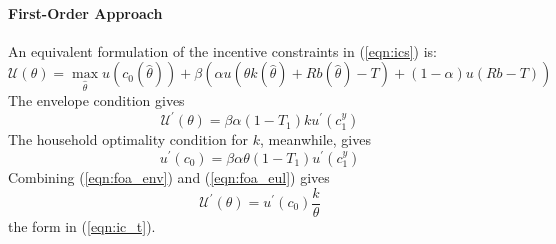 \documentclass[11pt]{article}
\newcommand{\p}{\prime}
\begin{document}
\paragraph{First-Order Approach} 
An equivalent formulation of the incentive constraints in (\ref{eqn:ics}) is:
\begin{equation}
    \mathcal{U}\left(\theta\right)=\max_{\hat{\theta}}u\left(c_{0}\left(\hat{\theta}\right)\right)+\beta\left(\alpha u\left(\theta k\left(\hat{\theta}\right)+Rb\left(\hat{\theta}\right)-T\right)+\left(1-\alpha\right)u\left(Rb-T\right)\right)
\end{equation}
The envelope condition gives
\begin{equation}
    \mathcal{U}^{\prime}\left(\theta\right)=\beta\alpha\left(1-T_{1}\right)ku^{\prime}\left(c_{1}^{y}\right) \label{eqn:foa_env}
\end{equation}
The household optimality condition for \( k \), meanwhile, gives 
\begin{equation}
    u^{\prime}\left(c_{0}\right)=\beta\alpha\theta\left(1-T_{1}\right)u^{\prime}\left(c_{1}^{y}\right) \label{eqn:foa_eul}
\end{equation}
Combining (\ref{eqn:foa_env}) and (\ref{eqn:foa_eul}) gives 
\begin{equation*}
    \mathcal{U}^\p\left( \theta \right) = u^\p(c_0)\frac{k}{\theta}
\end{equation*}
the form in (\ref{eqn:ic_t}).
\end{document}
